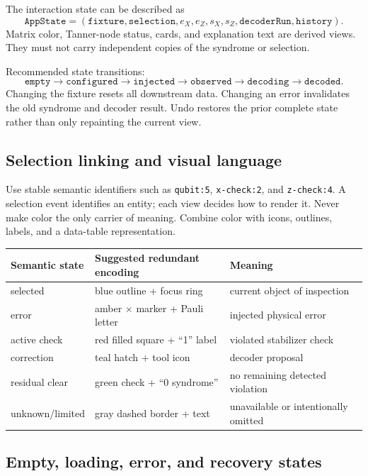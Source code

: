 \documentclass[11pt]{article}
\begin{document}
The interaction state can be described as
\[
\texttt{AppState}=(\texttt{fixture},\texttt{selection},e_X,e_Z,s_X,s_Z,
\texttt{decoderRun},\texttt{history}).
\]
Matrix color, Tanner-node status, cards, and explanation text are derived views. They must not carry
independent copies of the syndrome or selection.

Recommended state transitions:
\[
\texttt{empty}\to\texttt{configured}\to\texttt{injected}\to
\texttt{observed}\to\texttt{decoding}\to\texttt{decoded}.
\]
Changing the fixture resets all downstream data. Changing an error invalidates the old syndrome and
decoder result. Undo restores the prior complete state rather than only repainting the current view.

\subsection{Selection linking and visual language}

Use stable semantic identifiers such as \texttt{qubit:5}, \texttt{x-check:2}, and
\texttt{z-check:4}. A selection event identifies an entity; each view decides how to render it.
Never make color the only carrier of meaning. Combine color with icons, outlines, labels, and a
data-table representation.

\begin{center}
\begin{tabular}{lll}
\toprule
Semantic state & Suggested redundant encoding & Meaning \\
\midrule
selected & blue outline + focus ring & current object of inspection \\
error & amber \(\times\) marker + Pauli letter & injected physical error \\
active check & red filled square + ``1'' label & violated stabilizer check \\
correction & teal hatch + tool icon & decoder proposal \\
residual clear & green check + ``0 syndrome'' & no remaining detected violation \\
unknown/limited & gray dashed border + text & unavailable or intentionally omitted \\
\bottomrule
\end{tabular}
\end{center}

\subsection{Empty, loading, error, and recovery states}
\end{document}
